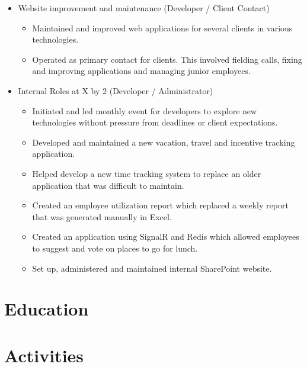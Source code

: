 \documentclass[12pt,letterpaper,sans]{moderncv}
\begin{document}
\begin{itemize}[leftmargin=1.24in]
\begin{itemize}
            \end{itemize}
        \item Website improvement and maintenance (Developer / Client Contact)
        	\begin{itemize}
        		\item Maintained and improved web applications for several clients in various technologies.
        		\item Operated as primary contact for clients. This involved fielding calls, fixing and improving applications and managing junior employees.
        	\end{itemize}
        \item Internal Roles at X by 2 (Developer / Administrator)
            \begin{itemize}
            	\item Initiated and led monthly event for developers to explore new technologies without pressure from deadlines or client expectations.
                \item Developed and maintained a new vacation, travel and incentive tracking application.
                \item Helped develop a new time tracking system to replace an older application that was difficult to maintain.
                \item Created an employee utilization report which replaced a weekly report that was generated manually in Excel.
                \item Created an application using SignalR and Redis which allowed employees to suggest and vote on places to go for lunch.
                \item Set up, administered and maintained internal SharePoint website.
            \end{itemize}
    \end{itemize}


\section{Education}

\section{Activities}
\end{document}
